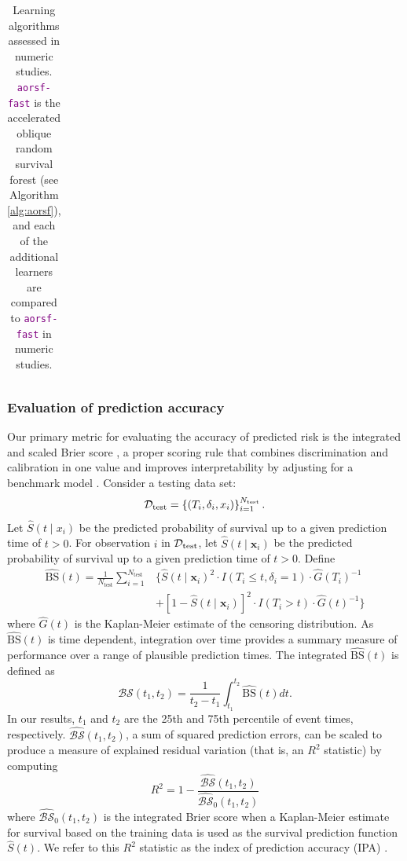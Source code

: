 \documentclass[twoside,11pt]{article}\usepackage[]{graphicx}\usepackage[]{xcolor}
\newcommand{\dataset}{{\cal D}}
\newcommand{\ie}{that is}
\newcommand{\bstat}{\widehat{\text{BS}}(t)}
\newcommand{\bsbar}{\mathcal{\widehat{BS}}(t_1, t_2)}
\newcommand{\bskap}{\mathcal{\widehat{BS}}_0(t_1, t_2)}
\newcommand{\ntest}{N_{\text{test}}}
\begin{document}
\begin{landscape}
\begin{table}[h!]
\begin{tabular}{p{2cm} | p{3cm} p{4cm} p{12cm}}
\end{tabular}
\caption{Learning algorithms assessed in numeric studies. \textcolor{purple}{\texttt{aorsf-fast}} is the accelerated oblique random survival forest (see Algorithm \ref{alg:aorsf}), and each of the additional learners are compared to \textcolor{purple}{\texttt{aorsf-fast}} in numeric studies.}
\label{tab:learners}
\end{table}

\end{landscape}
\restoregeometry



\subsubsection{Evaluation of prediction accuracy} \label{sec:prediction_accuracy}

Our primary metric for evaluating the accuracy of predicted risk is the integrated and scaled Brier score \citep{graf1999assessment}, a proper scoring rule that combines discrimination and calibration in one value and improves interpretability by adjusting for a benchmark model \citep{kattan2018index}. Consider a testing data set:
$$\dataset_{\text{test}} = \left\{ (T_i, \delta_i, x_{i}) \right\}_{i=1}^{N_{\text{test}}}.$$
Let $\widehat{S}(t \mid x_i)$ be the predicted probability of survival up to a given prediction time of $t > 0$.
 For observation $i$ in $\dataset_{\text{test}}$, let $\widehat{S}(t \mid \bm{x}_i)$ be the predicted probability of survival up to a given prediction time of $t > 0$. Define \begin{align*}
\bstat = \frac{1}{\ntest} \sum_{i=1}^{\ntest} &\{ \widehat{S}(t \mid \bm{x}_i)^2 \cdot I(T_i \leq t, \delta_i = 1) \cdot \widehat{G}(T_i)^{-1} \\ &+ [1-\widehat{S}(t \mid \bm{x}_i)]^2 \cdot I(T_i > t) \cdot \widehat{G}(t)^{-1}\}
\end{align*} where $\widehat{G}(t)$ is the Kaplan-Meier estimate of the censoring distribution. As $\bstat$ is time dependent, integration over time provides a summary measure of performance over a range of plausible prediction times. The integrated $\bstat$ is defined as \begin{equation}
\bsbar = \frac{1}{t_2 - t_1}\int_{t_1}^{t_2} \widehat{\text{BS}}(t) dt.
\end{equation} In our results, $t_1$ and $t_2$ are the 25th and 75th percentile of event times, respectively. $\bsbar$, a sum of squared prediction errors, can be scaled to produce a measure of explained residual variation (\ie, an $R^2$ statistic) by computing \begin{equation}
R^2 = 1 - \frac{\bsbar}{\bskap}
\end{equation} where $\bskap$ is the integrated Brier score when a Kaplan-Meier estimate for survival based on the training data is used as the survival prediction function $\widehat{S}(t)$. We refer to this $R^2$ statistic as the index of prediction accuracy (IPA) \citep{kattan2018index}.
\end{document}
